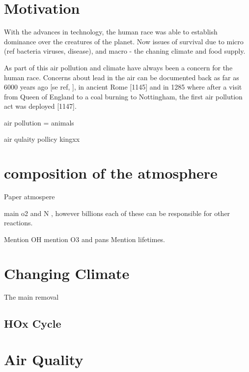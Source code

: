 \section{Motivation}
With the advances in technology, the human race was able to establish dominance over the creatures of the planet. Now issues of survival due to micro (ref bacteria viruses, disease), and macro - the chaning climate and food supply.

As part of this air pollution and climate have always been a concern for the human race. Concerns about lead in the air can be documented back as far as 6000 years ago [se ref, ], in ancient Rome [1145] and in 1285 where after a visit from Queen of England to a coal burning to Nottingham, the first air pollution act was deployed [1147].

air pollution = animals

air qulaity pollicy
kingxx




\section{composition of the atmosphere}

Paper atmospere

main o2 and N ,
however billions
each of these can be responsible for other reactions.

Mention OH mention O3 and pans
Mention lifetimes.




\section{Changing Climate}



The main removal

\subsection{HOx Cycle}





\section{Air Quality}


